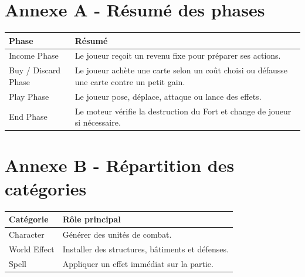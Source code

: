 \documentclass[12pt,a4paper]{article}
\begin{document}
\appendix
\section{Annexe A - Résumé des phases}
\begin{longtable}{p{} p{}}
\toprule
\textbf{Phase} & \textbf{Résumé} \\
\midrule
Income Phase & Le joueur reçoit un revenu fixe pour préparer ses actions. \\
Buy / Discard Phase & Le joueur achète une carte selon un coût choisi ou défausse une carte contre un petit gain. \\
Play Phase & Le joueur pose, déplace, attaque ou lance des effets. \\
End Phase & Le moteur vérifie la destruction du Fort et change de joueur si nécessaire. \\
\bottomrule
\end{longtable}

\section{Annexe B - Répartition des catégories}
\begin{longtable}{p{} p{}}
\toprule
\textbf{Catégorie} & \textbf{Rôle principal} \\
\midrule
Character & Générer des unités de combat. \\
World Effect & Installer des structures, bâtiments et défenses. \\
Spell & Appliquer un effet immédiat sur la partie. \\
\bottomrule
\end{longtable}
\end{document}
